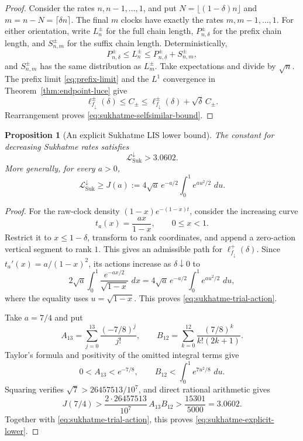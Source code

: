 \documentclass[11pt]{article}
\newtheorem{proposition}[theorem]{Proposition}
\theoremstyle{remark}
\newcommand{\dd}{\,d}
\newcommand{\calL}{\mathcal L}
\begin{document}
\begin{proof}
Consider the rates $n,n-1,\dots,1$, and put
$N=\lfloor(1-\delta)n\rfloor$ and $m=n-N=\lceil\delta n\rceil$.
The final $m$ clocks have exactly the rates $m,m-1,\dots,1$.
For either orientation, write $L_n^\pm$ for the full chain length,
$P_{n,\delta}^\pm$ for the prefix chain length, and $S_{n,m}^\pm$
for the suffix chain length.  Deterministically,
\[
        P_{n,\delta}^\pm\le L_n^\pm
        \le P_{n,\delta}^\pm+S_{n,m}^\pm,
\]
and $S_{n,m}^\pm$ has the same distribution as $L_m^\pm$.
Take expectations and divide by $\sqrt n$.
The prefix limit \eqref{eq:prefix-limit} and the $L^1$ convergence in
Theorem~\ref{thm:endpoint-luce} give
\[
 \ell_{f_\downarrow}^{\pm}(\delta)
 \le C_\pm
 \le\ell_{f_\downarrow}^{\pm}(\delta)+\sqrt\delta\,C_\pm.
\]
Rearrangement proves \eqref{eq:sukhatme-selfsimilar-bound}.
\end{proof}

\begin{proposition}[An explicit Sukhatme LIS lower bound]
\label{prop:sukhatme-explicit-lower}
The constant for decreasing Sukhatme rates satisfies
\begin{equation}\label{eq:sukhatme-explicit-lower}
        \calL_{\mathrm{Suk}}^\downarrow>3.0602.
\end{equation}
More generally, for every $a>0$,
\begin{equation}\label{eq:sukhatme-trial-action}
 \calL_{\mathrm{Suk}}^\downarrow
 \ge J(a):=4\sqrt a\,e^{-a/2}
                  \int_0^1e^{au^2/2}\,\dd u.
\end{equation}
\end{proposition}

\begin{proof}
For the raw-clock density $(1-x)e^{-(1-x)t}$, consider the increasing curve
\[
        t_a(x)=\frac{ax}{1-x},\qquad 0\le x<1.
\]
Restrict it to $x\le1-\delta$, transform to rank coordinates, and append
a zero-action vertical segment to rank $1$.  This gives an admissible path
for $\ell_{f_\downarrow}^+(\delta)$.  Since
$t_a'(x)=a/(1-x)^2$, its actions increase as $\delta\downarrow0$ to
\[
 2\sqrt a\int_0^1\frac{e^{-ax/2}}{\sqrt{1-x}}\,\dd x
 =4\sqrt a\,e^{-a/2}\int_0^1e^{au^2/2}\,\dd u,
\]
where the equality uses $u=\sqrt{1-x}$.
This proves \eqref{eq:sukhatme-trial-action}.

Take $a=7/4$ and put
\[
 A_{13}=\sum_{j=0}^{13}\frac{(-7/8)^j}{j!},
 \qquad
 B_{12}=\sum_{k=0}^{12}\frac{(7/8)^k}{k!(2k+1)}.
\]
Taylor's formula and positivity of the omitted integral terms give
\[
 0<A_{13}<e^{-7/8},\qquad
 B_{12}<\int_0^1e^{7u^2/8}\,\dd u.
\]
Squaring verifies $\sqrt7>26457513/10^7$, and direct rational arithmetic
gives
\[
 J(7/4)
 >\frac{2\cdot26457513}{10^7}\,A_{13}B_{12}
 >\frac{15301}{5000}=3.0602.
\]
Together with \eqref{eq:sukhatme-trial-action}, this proves
\eqref{eq:sukhatme-explicit-lower}.
\end{proof}
\end{document}
